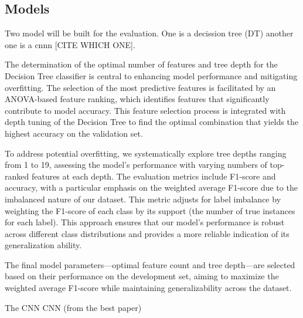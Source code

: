 
\subsection{Models}
Two model will be built for the evaluation. One is a decission tree (DT) another one is a cnnn [CITE WHICH ONE]. 


The determination of the optimal number of features and tree depth for the Decision Tree classifier is central to enhancing model performance and mitigating overfitting. The selection of the most predictive features is facilitated by an ANOVA-based feature ranking, which identifies features that significantly contribute to model accuracy. This feature selection process is integrated with depth tuning of the Decision Tree to find the optimal combination that yields the highest accuracy on the validation set.

To address potential overfitting, we systematically explore tree depths ranging from 1 to 19, assessing the model's performance with varying numbers of top-ranked features at each depth. The evaluation metrics include F1-score and accuracy, with a particular emphasis on the weighted average F1-score due to the imbalanced nature of our dataset. This metric adjusts for label imbalance by weighting the F1-score of each class by its support (the number of true instances for each label). This approach ensures that our model's performance is robust across different class distributions and provides a more reliable indication of its generalization ability.

The final model parameters—optimal feature count and tree depth—are selected based on their performance on the development set, aiming to maximize the weighted average F1-score while maintaining generalizability across the dataset.


The CNN  CNN (from the best paper)

